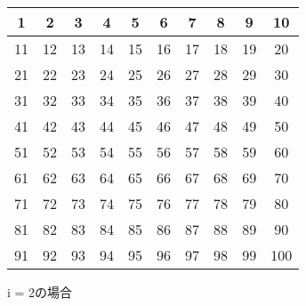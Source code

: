 \begin{center}
  \begin{tabular}{|c|c|c|c|c|c|c|c|c|c|}
      \hline
      1  & 2  & 3  & 4  & 5  & 6  & 7  & 8  & 9  & 10 \\ \hline
      11 & 12 & 13 & 14 & 15 & 16 & 17 & 18 & 19 & 20 \\ \hline
      21 & 22 & 23 & 24 & 25 & 26 & 27 & 28 & 29 & 30 \\ \hline
      31 & 32 & 33 & 34 & 35 & 36 & 37 & 38 & 39 & 40 \\ \hline
      41 & 42 & 43 & 44 & 45 & 46 & 47 & 48 & 49 & 50 \\ \hline
      51 & 52 & 53 & 54 & 55 & 56 & 57 & 58 & 59 & 60 \\ \hline
      61 & 62 & 63 & 64 & 65 & 66 & 67 & 68 & 69 & 70 \\ \hline
      71 & 72 & 73 & 74 & 75 & 76 & 77 & 78 & 79 & 80 \\ \hline
      81 & 82 & 83 & 84 & 85 & 86 & 87 & 88 & 89 & 90 \\ \hline
      91 & 92 & 93 & 94 & 95 & 96 & 97 & 98 & 99 & 100 \\ \hline
  \end{tabular}

\end{center}
\vspace{0.1cm}


\begin{center}
    i = 2の場合
\end{center}

\vspace{0.5cm}

